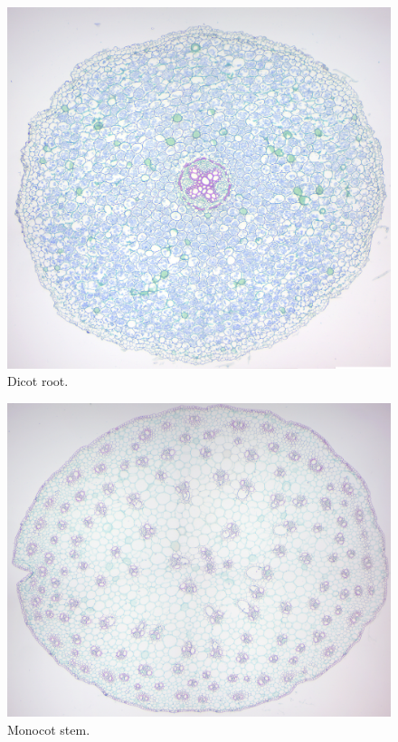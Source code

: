 \begin{figure}

{\centering \includegraphics[width=0.7\linewidth]{./figures/gymnosperms/Dicot_root}

}

\caption{Dicot root.}\label{fig:dicotroot}
\end{figure}

\begin{figure}

{\centering \includegraphics[width=0.7\linewidth]{./figures/gymnosperms/monocot_stem}

}

\caption{Monocot stem.}\label{fig:monocotstem}
\end{figure}

